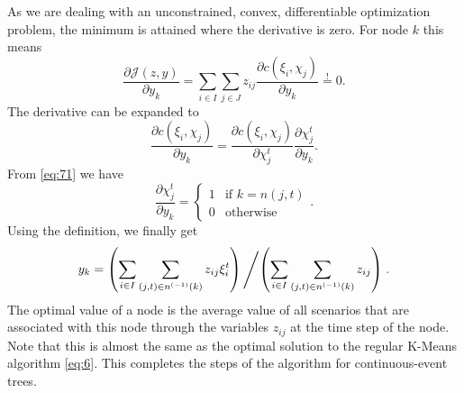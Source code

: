 As we are dealing with an unconstrained, convex, differentiable optimization problem, the minimum is attained where the derivative is zero.
For node $k$ this means
\begin{equation}
  \label{eq:12}
  \frac{\partial \mathcal{J}(z,y)}{\partial y_k} = \sum_{i\in I}\sum_{j\in J}z_{ij}\frac{\partial c(\xi_i, \chi_j)}{\partial y_k}\overset{!}{=} 0.
\end{equation}
The derivative can be expanded to
\begin{equation}
  \label{eq:13}
  \frac{\partial c(\xi_i, \chi_j)}{\partial y_k} = \frac{\partial c(\xi_i, \chi_j)}{\partial \chi_j^t}\frac{\partial \chi_j^t}{\partial y_k}.
\end{equation}
From \eqref{eq:71} we have
\begin{equation}
  \label{eq:14}
  \frac{\partial \chi_j^t}{\partial y_k} =
  \left\{
    \begin{array}{ll}
      1&\text{if } k = n(j,t)\\0&\text{otherwise}
    \end{array}
  \right. .
\end{equation}
Using the definition, we finally get
\begin{align}
  \label{eq:15}
  y_k = \left(\sum_{i\in I}\sum_{(j,t)\in n^{(-1)}(k)}z_{ij}\xi_i^t \right) \left / \left(\sum_{i\in I}\sum_{(j,t)\in n^{(-1)}(k)}z_{ij}\right)\right. .
\end{align}
The optimal value of a node is the average value of all scenarios that are associated with this node through the variables $z_{ij}$ at the time step of the node.
Note that this is almost the same as the optimal solution to the regular K-Means algorithm \eqref{eq:6}.
This completes the steps of the algorithm for continuous-event trees.

